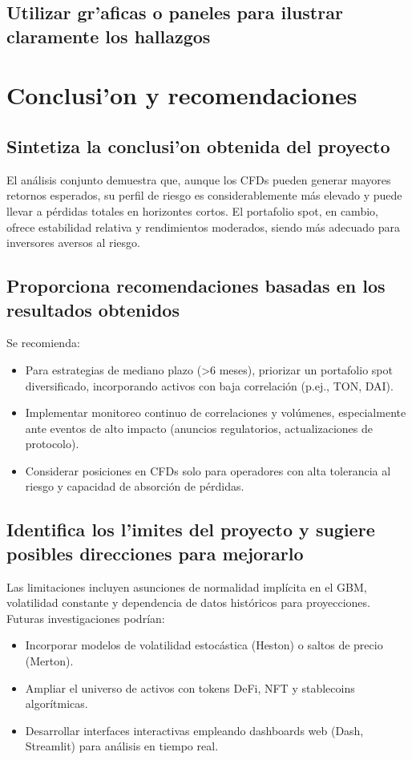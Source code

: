 \documentclass[12pt,letterpaper]{article}   %
\begin{document}
\subsection{Utilizar gr'{a}ficas o paneles para ilustrar claramente los hallazgos}

\section{Conclusi'{o}n y recomendaciones}
\subsection{Sintetiza la conclusi'{o}n obtenida del proyecto}
El análisis conjunto demuestra que, aunque los CFDs pueden generar mayores retornos esperados, su perfil de riesgo es considerablemente más elevado y puede llevar a pérdidas totales en horizontes cortos. El portafolio spot, en cambio, ofrece estabilidad relativa y rendimientos moderados, siendo más adecuado para inversores aversos al riesgo.

\subsection{Proporciona recomendaciones basadas en los resultados obtenidos}
Se recomienda:
\begin{itemize}
\item Para estrategias de mediano plazo (>6 meses), priorizar un portafolio spot diversificado, incorporando activos con baja correlación (p.ej., TON, DAI).
\item Implementar monitoreo continuo de correlaciones y volúmenes, especialmente ante eventos de alto impacto (anuncios regulatorios, actualizaciones de protocolo).
\item Considerar posiciones en CFDs solo para operadores con alta tolerancia al riesgo y capacidad de absorción de pérdidas.
\end{itemize}

\subsection{Identifica los l'{i}mites del proyecto y sugiere posibles direcciones para mejorarlo}
Las limitaciones incluyen asunciones de normalidad implícita en el GBM, volatilidad constante y dependencia de datos históricos para proyecciones. Futuras investigaciones podrían:
\begin{itemize}
\item Incorporar modelos de volatilidad estocástica (Heston) o saltos de precio (Merton).
\item Ampliar el universo de activos con tokens DeFi, NFT y stablecoins algorítmicas.
\item Desarrollar interfaces interactivas empleando dashboards web (Dash, Streamlit) para análisis en tiempo real.
\end{itemize}
\end{document}
